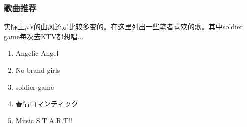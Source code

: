 \documentclass{ctexart}
\begin{document}
\subsubsection*{歌曲推荐}
实际上$\mu$'s的曲风还是比较多变的。在这里列出一些笔者喜欢的歌。其中soldier game每次去KTV都想唱...
\begin{enumerate}
\item Angelic Angel
\item No brand girls
\item soldier game
\item 春情ロマンティック
\item Music S.T.A.R.T!!
\end{enumerate}
\end{document}
